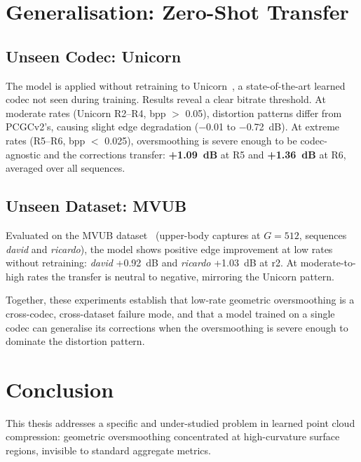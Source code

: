 \section*{Generalisation: Zero-Shot Transfer}

\subsection*{Unseen Codec: Unicorn}

The model is applied without retraining to Unicorn~\cite{wang2025unicorn},
a state-of-the-art learned codec not seen during training.
Results reveal a clear bitrate threshold.
At moderate rates (Unicorn R2--R4, bpp $>$ 0.05), distortion patterns differ
from PCGCv2's, causing slight edge degradation ($-$0.01 to $-$0.72~dB).
At extreme rates (R5--R6, bpp $<$ 0.025), oversmoothing is severe enough to
be codec-agnostic and the corrections transfer: \textbf{+1.09~dB} at R5 and
\textbf{+1.36~dB} at R6, averaged over all sequences.

\subsection*{Unseen Dataset: MVUB}

Evaluated on the MVUB dataset~\cite{loop2016mvub} (upper-body captures at
$G=512$, sequences \textit{david} and \textit{ricardo}), the model shows
positive edge improvement at low rates without retraining:
\textit{david} +0.92~dB and \textit{ricardo} +1.03~dB at r2.
At moderate-to-high rates the transfer is neutral to negative, mirroring
the Unicorn pattern.

Together, these experiments establish that low-rate geometric oversmoothing
is a cross-codec, cross-dataset failure mode, and that a model trained on a
single codec can generalise its corrections when the oversmoothing is severe
enough to dominate the distortion pattern.

\section*{Conclusion}

This thesis addresses a specific and under-studied problem in learned point
cloud compression: geometric oversmoothing concentrated at high-curvature
surface regions, invisible to standard aggregate metrics.

